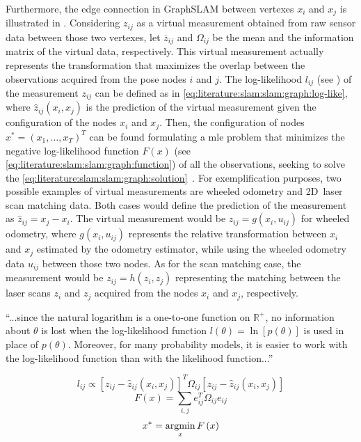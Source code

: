 Furthermore, the edge connection in GraphSLAM between vertexes $x_i$ and $x_j$
is illustrated in .
Considering $z_{ij}$ as a virtual measurement obtained from raw sensor data
between those two vertexes, let $\overline{z}_{ij}$ and $\Omega_{ij}$
be the mean and the information matrix of the virtual data, respectively.
This virtual measurement actually represents the transformation that maximizes
the overlap between the observations acquired from the pose nodes $i$ and $j$.
The log-likelihood $l_{ij}$ (see )
of the measurement $z_{ij}$ can be defined as in
\eqref{eq:literature:slam:slam:graph:log-like},
where $\hat{z}_{ij}\left(x_i,x_j\right)$ is the prediction of the
virtual measurement given the configuration of the nodes $x_i$ and $x_j$.
Then, the configuration of nodes $x^*=\left(x_1,\dots,x_T\right)^T$ can be found
formulating a \gls{mle} problem that minimizes the negative log-likelihood
function $F\left(x\right)$ (see \eqref{eq:literature:slam:slam:graph:function})
of all the observations, seeking to solve the
\eqref{eq:literature:slam:slam:graph:solution}~\cite{grisetti:itsm:2010}.
For exemplification purposes, two possible examples of virtual measurements
are wheeled odometry and 2D~laser scan matching data. Both cases would define
the prediction of the measurement as $\hat{z}_{ij}=x_j-x_i$.
The virtual measurement would be $z_{ij}=g\left(x_i,u_{ij}\right)$
for wheeled odometry, where $g\left(x_i,u_{ij}\right)$ represents
the relative transformation between $x_i$ and $x_j$ estimated by
the odometry estimator, while using the wheeled odometry data $u_{ij}$
between those two nodes. As for the scan matching case,
the measurement would be $z_{ij}=h\left(z_i,z_j\right)$ representing the
matching between the laser scans $z_i$ and $z_j$ acquired from
the nodes $x_i$ and $x_j$, respectively.

\begin{definition}\label{def:literature:slam:log-likelihood}
``...since the natural logarithm is a one-to-one function on $\mathbb{R}^+$,
no information about $\theta$ is lost when the log-likelihood function
$l\left(\theta\right)=\ln\left[p\left(\theta\right)\right]$ is used in place of
$p\left(\theta\right)$. Moreover, for many probability models,
it is easier to work with the log-likelihood function
than with the likelihood function...''
\end{definition}

\begin{equation}\label{eq:literature:slam:slam:graph:log-like}
l_{ij} \propto \left[z_{ij}-\hat{z}_{ij}\left(x_i,x_j\right)\right]^T \Omega_{ij} \left[z_{ij}-\hat{z}_{ij}\left(x_i,x_j\right)\right]
\end{equation}
\begin{equation}\label{eq:literature:slam:slam:graph:function}
F\left(x\right) = \sum_{i,j} e_{ij}^T \Omega_{ij} e_{ij}
\end{equation}
\begin{equation}\label{eq:literature:slam:slam:graph:solution}
x^* = \operatorname*{argmin}_x F\left(x\right)
\end{equation}

